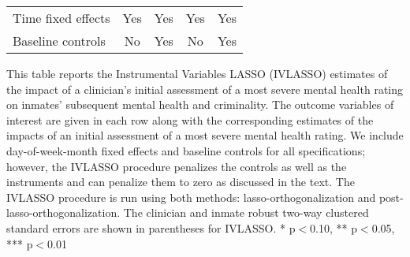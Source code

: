 \begin{table}[htbp]
\begin{center}
\begin{adjustbox}{width=\textwidth, totalheight=\baselineskip,keepaspectratio}
\begin{threeparttable}
\begin{tabular}{p{}*{4}{c}}
\midrule
Time fixed effects  &         Yes   &         Yes   &         Yes   &         Yes   \\
Baseline controls   &          No   &         Yes   &          No   &         Yes   \\
\bottomrule
\end{tabular}
\tiny
This table reports  the Instrumental Variables LASSO (IVLASSO) estimates of the impact of a clinician's initial assessment of a most severe mental health rating on inmates' subsequent mental health and criminality. The outcome variables of interest are given in each row along with the corresponding estimates of the impacts of an initial assessment of a most severe mental health rating. We include day-of-week-month fixed effects and baseline controls for all specifications; however, the IVLASSO procedure penalizes the controls as well as the instruments and can penalize them to zero as discussed in the text. The IVLASSO procedure is run using both methods: lasso-orthogonalization and post-lasso-orthogonalization. The clinician and inmate robust two-way clustered standard errors are shown in parentheses for IVLASSO. * p$<$0.10, ** p$<$0.05, *** p$<$0.01
\end{threeparttable}
\end{adjustbox}
\end{center}
\end{table}


